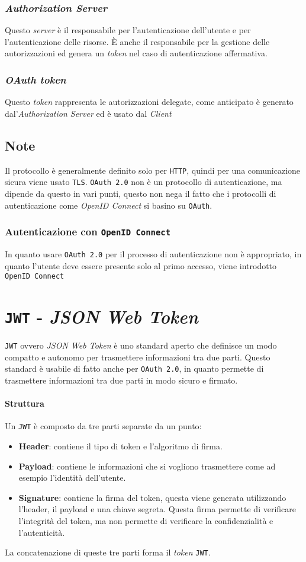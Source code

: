         \subsubsection{\textit{Authorization Server}}
            Questo \textit{server} è il responsabile per l'autenticazione dell'utente e per l'autenticazione delle risorse. È anche il responsabile per la gestione delle autorizzazioni ed genera un \textit{token} nel caso di autenticazione affermativa.
        \subsubsection{\textit{OAuth token}}
            Questo \textit{token} rappresenta le autorizzazioni delegate, come anticipato è generato dal'\textit{Authorization Server} ed è usato dal \textit{Client}
    \subsection{Note}
        Il protocollo è generalmente definito solo per \texttt{HTTP}, quindi per una comunicazione sicura viene usato \texttt{TLS}. \texttt{OAuth 2.0} non è un protocollo di autenticazione, ma dipende da questo in vari punti, questo non nega il fatto che i protocolli di autenticazione come \textit{OpenID Connect} si basino su \texttt{OAuth}.
        \subsubsection{Autenticazione con \texttt{OpenID Connect}}
            In quanto usare \texttt{OAuth 2.0} per il processo di autenticazione non è appropriato, in quanto l'utente deve essere presente solo al primo accesso, viene introdotto \texttt{OpenID Connect} 
\section{\texttt{JWT} - \textit{JSON Web Token}}
    \texttt{JWT} ovvero \textit{JSON Web Token} è uno standard aperto che definisce un modo compatto e autonomo per trasmettere informazioni tra due parti. Questo standard è usabile di fatto anche per \texttt{OAuth 2.0}, in quanto permette di trasmettere informazioni tra due parti in modo sicuro e firmato.
    \paragraph{Struttura}
        Un \texttt{JWT} è composto da tre parti separate da un punto:
        \begin{itemize}
            \item \textbf{Header}: contiene il tipo di token e l'algoritmo di firma.
            \item \textbf{Payload}: contiene le informazioni che si vogliono trasmettere come ad esempio l'identità dell'utente.
            \item \textbf{Signature}: contiene la firma del token, questa viene generata utilizzando l'header, il payload e una chiave segreta. Questa firma permette di verificare l'integrità del token, ma non permette di verificare la confidenzialità e l'autenticità.
        \end{itemize}
        La concatenazione di queste tre parti forma il \textit{token} \texttt{JWT}.
